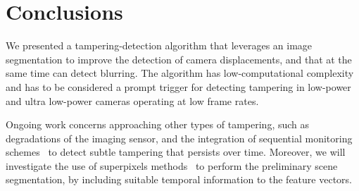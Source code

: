 \documentclass{llncs}
\begin{document}
\section{Conclusions}\label{sec:Conclusion}
\vspace{-0.1cm}
We presented a tampering-detection algorithm that leverages an image segmentation to improve the detection of camera displacements, and that at the same time can detect blurring. The algorithm has low-computational complexity and has to be considered a prompt trigger for detecting tampering in low-power and ultra low-power cameras operating at low frame rates.

Ongoing work concerns approaching other types of tampering, such as degradations of the imaging sensor, and the integration of sequential monitoring schemes~\cite{alippi2010detecting} to detect subtle tampering that persists over time. Moreover, we will investigate the use of superpixels methods~\cite{Susstrunk2012} to perform the preliminary scene segmentation, by including suitable temporal information to the feature vectors.








%	
%	
\end{document}
